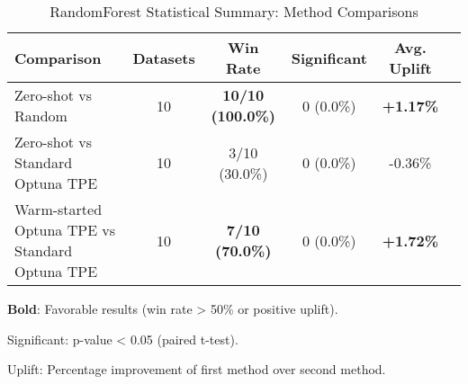 \begin{table}[htbp]
\centering
\caption{RandomForest Statistical Summary: Method Comparisons}
\label{tab:randomforest_stats_summary}
\begin{tabular}{lccccc}
\toprule
Comparison & Datasets & Win Rate & Significant & Avg. Uplift \\
\midrule
Zero-shot vs Random & 10 & \textbf{10/10 (100.0\%)} & 0 (0.0\%) & \textbf{+1.17\%} \\
Zero-shot vs Standard Optuna TPE & 10 & 3/10 (30.0\%) & 0 (0.0\%) & -0.36\% \\
Warm-started Optuna TPE vs Standard Optuna TPE & 10 & \textbf{7/10 (70.0\%)} & 0 (0.0\%) & \textbf{+1.72\%} \\
\bottomrule
\end{tabular}
\begin{tablenotes}
\small
\item \textbf{Bold}: Favorable results (win rate > 50\% or positive uplift).
\item Significant: p-value < 0.05 (paired t-test).
\item Uplift: Percentage improvement of first method over second method.
\end{tablenotes}
\end{table}